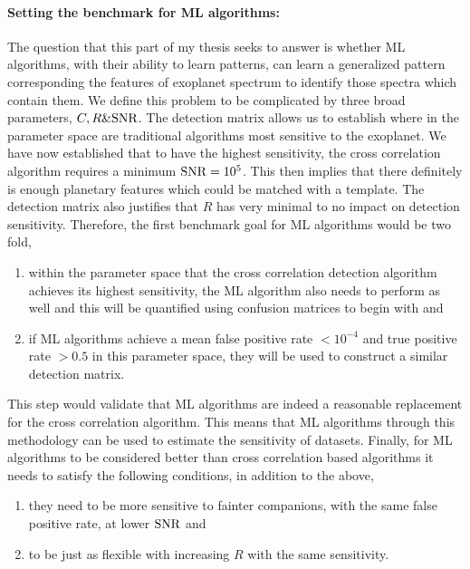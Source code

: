 \paragraph{Setting the benchmark for ML algorithms:\\}
The question that this part of my thesis seeks to answer is whether ML algorithms, with their ability to learn patterns, can learn a generalized pattern corresponding the features of exoplanet spectrum to identify those spectra which contain them.
We define this problem to be complicated by three broad parameters, $C,R \& \rm{SNR}$.
The detection matrix allows us to establish where in the parameter space are traditional algorithms most sensitive to the exoplanet. 
We have now established that to have the highest sensitivity, the cross correlation algorithm requires a minimum $\rm{SNR} =10^{5}$.
This then implies that there definitely is enough planetary features which could be matched with a template.
The detection matrix also justifies that $R$ has very minimal to no impact on  detection sensitivity.
Therefore, the first benchmark goal for ML algorithms would be two fold,
\begin{enumerate}
    \item within the parameter space that the cross correlation detection algorithm achieves its highest sensitivity, the ML algorithm also needs to perform as well and this will be quantified using confusion matrices to begin with and 
    \item if ML algorithms achieve a mean false positive rate $<10^{-4}$ and true positive rate $>0.5$ in this parameter space, they will be used to construct a similar detection matrix.
\end{enumerate}
This step would validate that ML algorithms are indeed a reasonable replacement for the cross correlation algorithm. This means that ML algorithms through this methodology can be used to estimate the sensitivity of datasets.
Finally, for ML algorithms to be considered better than cross correlation based algorithms it needs to satisfy the following conditions, in addition to the above,
\begin{enumerate}
    \item they need to be more sensitive to fainter companions, with the same false positive rate, at lower $\rm{SNR}$ and
    \item to be just as flexible with increasing $R$ with the same sensitivity.
\end{enumerate}
